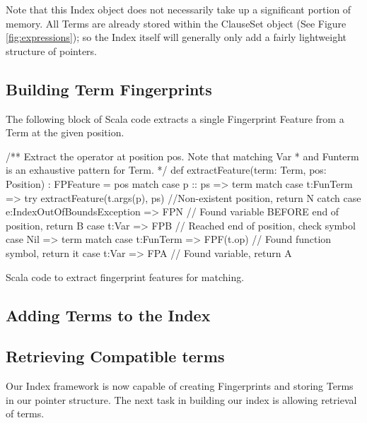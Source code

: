 Note that this Index object does not necessarily take up a significant portion of memory.
All Terms are already stored within the ClauseSet object (See Figure \ref{fig:expressions});
so the Index itself will generally only add a fairly lightweight structure of pointers.


\subsection{Building Term Fingerprints}

The following block of Scala code extracts a single Fingerprint Feature from
a Term at the given position.
\begin{listing}[H]
\begin{scalacode}
 /** Extract the operator at position pos. Note that matching Var
   * and Funterm is an exhaustive pattern for Term. */
  def extractFeature(term: Term, pos: Position) : FPFeature = pos match {
    case p :: ps => term match {
      case t:FunTerm => try   {extractFeature(t.args(p), ps) }
                        //Non-existent position, return N
                        catch {case e:IndexOutOfBoundsException => FPN}
      // Found variable BEFORE end of position, return B
      case t:Var     => FPB 
    }
    // Reached end of position, check symbol
    case Nil     => term match {
      case t:FunTerm => FPF(t.op) // Found function symbol, return it
      case t:Var     => FPA       // Found variable, return A
    }
  }
\end{scalacode}
\caption{Scala code to extract fingerprint features for matching.}
\label{lst:posextract}
\end{listing} 

\subsection{Adding Terms to the Index}

\subsection{Retrieving Compatible terms}

Our Index framework is now capable of creating Fingerprints and storing Terms in
our pointer structure. The next task in building our index is allowing retrieval
of terms.

